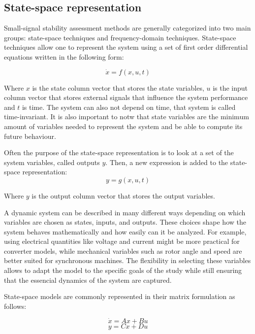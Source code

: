\subsection{State-space representation}

Small-signal stability assessment methods are generally categorized into two main groups: state-space techniques
and frequency-domain techniques. State-space techniques allow one to represent the system using a set of first order
differential equations written in the following form:

\begin{equation}
    \dot{x} = f(x,u,t)
\end{equation}

Where $x$ is the state column vector that stores the state variables, $u$ is the input column vector that stores external
signals that influence the system performance and $t$ is time. The system can also not depend on time, that system is called 
time-invariant. It is also important to notw that state variables are the minimum amount of variables needed to represent the
system and be able to compute its future behaviour.

Often the purpose of the state-space representation is to look at a set of the system variables, called outputs $y$. Then, a new 
expression is added to the state-space representation:
\begin{equation}
    y = g(x,u,t)
\end{equation}

Where $y$ is the output column vector that stores the output variables.

A dynamic system can be described in many different ways depending on which variables are chosen as states, inputs, 
and outputs. These choices shape how the system behaves mathematically and how easily can it be analyzed. For example, 
using electrical quantities like voltage and current might be more practical for converter models, while mechanical variables 
such as rotor angle and speed are better suited for synchronous machines. The flexibility in selecting these variables allows
to adapt the model to the specific goals of the study while still ensuring that the essencial dynamics of the system are captured. 

State-space models are commonly represented in their matrix formulation as follows:

\begin{equation}
\dot{x} = Ax + Bu
\end{equation}
\begin{equation}
y = Cx + Du
\end{equation}


